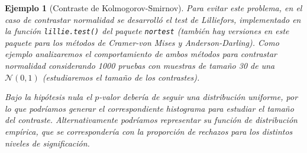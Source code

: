 \documentclass[
  spanish,
  10pt,
]{book}
\newenvironment{Shaded}{\begin{snugshade}}{\end{snugshade}}
\newcommand{\CommentTok}[1]{\textcolor[rgb]{0.56,0.35,0.01}{\textit{#1}}}
\newcommand{\ControlFlowTok}[1]{\textcolor[rgb]{0.13,0.29,0.53}{\textbf{#1}}}
\newcommand{\DecValTok}[1]{\textcolor[rgb]{0.00,0.00,0.81}{#1}}
\newcommand{\FunctionTok}[1]{\textcolor[rgb]{0.13,0.29,0.53}{\textbf{#1}}}
\newcommand{\NormalTok}[1]{#1}
\newcommand{\OtherTok}[1]{\textcolor[rgb]{0.56,0.35,0.01}{#1}}
\newcommand{\SpecialCharTok}[1]{\textcolor[rgb]{0.81,0.36,0.00}{\textbf{#1}}}
\newcommand{\StringTok}[1]{\textcolor[rgb]{0.31,0.60,0.02}{#1}}
\theoremstyle{break}
\newtheorem{example}{Ejemplo}[chapter]
\theoremstyle{nonumberplain}
\renewcommand{\CommentTok}[1]{\textcolor[rgb]{0.41,0.41,0.41}{\texttt{#1}}}
\begin{document}
\begin{example}[Contraste de Kolmogorov-Smirnov]
Para evitar este problema, en el caso de contrastar normalidad se desarrolló el test
de Lilliefors, implementado en la función \texttt{lillie.test()} del paquete \texttt{nortest}
(también hay versiones en este paquete para los métodos de Cramer-von Mises y
Anderson-Darling). Como ejemplo analizaremos el comportamiento de ambos métodos
para contrastar normalidad considerando 1000 pruebas con muestras de tamaño 30 de
una \(\mathcal{N}(0,1)\) (estudiaremos el \emph{tamaño de los contrastes}).

\begin{Shaded}
\end{Shaded}

Bajo la hipótesis nula el \(p\)-valor debería de seguir una distribución uniforme,
por lo que podríamos generar el correspondiente histograma para estudiar el
tamaño del contraste. Alternativamente podríamos representar su función de
distribución empírica, que se correspondería con la proporción de rechazos
para los distintos niveles de significación.


\end{example}
\end{document}
